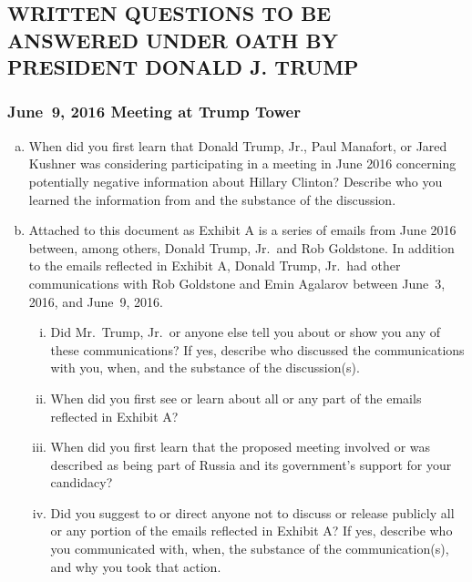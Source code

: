 \hr

\newpage

\subsection{WRITTEN QUESTIONS TO BE ANSWERED UNDER OATH BY PRESIDENT DONALD J. TRUMP}

\subsubsection{June~9, 2016 Meeting at Trump Tower}

\begin{enumerate}[a.]

\item When did you first learn that Donald Trump, Jr., Paul Manafort, or Jared Kushner was considering participating in a meeting in June 2016 concerning potentially negative information about Hillary Clinton?
Describe who you learned the information from and the substance of the discussion.

\item Attached to this document as Exhibit A is a series of emails from June 2016 between, among others, Donald Trump, Jr.\ and Rob Goldstone.
In addition to the emails reflected in Exhibit A, Donald Trump, Jr.\ had other communications with Rob Goldstone and Emin Agalarov between June~3, 2016, and June~9, 2016.

\begin{enumerate}[i.]

\item Did Mr.~Trump, Jr.\ or anyone else tell you about or show you any of these communications?
If yes, describe who discussed the communications with you, when, and the substance of the discussion(s).

\item When did you first see or learn about all or any part of the emails reflected in Exhibit A?

\item When did you first learn that the proposed meeting involved or was described as being part of Russia and its government's support for your candidacy?

\item Did you suggest to or direct anyone not to discuss or release publicly all or any portion of the emails reflected in Exhibit A? If yes, describe who you communicated with, when, the substance of the communication(s), and why you took that action.


\end{enumerate}
\end{enumerate}
